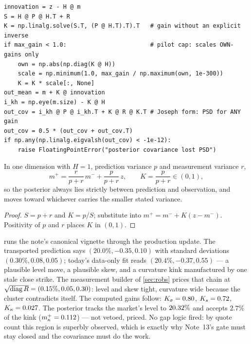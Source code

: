 \documentclass[11pt]{article}
\begin{document}
\begin{lstlisting}[caption={The production update (quoted from
\texttt{calib/observation\_filter.py}): \cref{eq:kalman} with the
own-gain pilot cap, Joseph covariance, and an explicit PSD guard.
Verified against the reference listing of \cref{app:ref} to
\ktrrefagree.},label={lst:crux}]
innovation = z - H @ m
S = H @ P @ H.T + R
K = np.linalg.solve(S.T, (P @ H.T).T).T   # gain without an explicit inverse
if max_gain < 1.0:                        # pilot cap: scales OWN-gains only
    own = np.abs(np.diag(K @ H))
    scale = np.minimum(1.0, max_gain / np.maximum(own, 1e-300))
    K = K * scale[:, None]
out_mean = m + K @ innovation
i_kh = np.eye(m.size) - K @ H
out_cov = i_kh @ P @ i_kh.T + K @ R @ K.T # Joseph form: PSD for ANY gain
out_cov = 0.5 * (out_cov + out_cov.T)
if np.any(np.linalg.eigvalsh(out_cov) < -1e-12):
    raise FloatingPointError("posterior covariance lost PSD")
\end{lstlisting}

\begin{proposition}
\label{prop:scalar}
In one dimension with $H=1$, prediction variance $p$ and measurement
variance $r$,
\[
m^+=\frac{r}{p+r}\,m^-+\frac{p}{p+r}\,z,
\qquad K=\frac{p}{p+r}\in(0,1),
\]
so the posterior always lies strictly between prediction and
observation, and moves toward whichever carries the smaller stated
variance.
\end{proposition}

\begin{proof}
$S=p+r$ and $K=p/S$; substitute into $m^+=m^-+K(z-m^-)$.  Positivity of
$p$ and $r$ places $K$ in $(0,1)$.
\end{proof}

 runs the note's canonical vignette through the
production update.  The transported prediction says
$(20.0\%,-0.35,0.10)$ with standard deviations $(0.30\%,0.08,0.05)$;
today's data-only fit reads $(20.4\%,-0.37,0.55)$ --- a plausible level
move, a plausible skew, and a curvature kink manufactured by one stale
close strike.  The measurement builder of \cref{sec:robs} prices that
chain at $\sqrt{\operatorname{diag} R}=(0.15\%,0.05,0.30)$: level and skew tight,
curvature wide because the cluster contradicts itself.  The computed
gains follow: $K_\sigma=0.80$, $K_s=0.72$,
$K_\kappa=0.027$.  The posterior tracks the market's level to
$20.32\%$ and accepts $2.7\%$ of the kink
($m^+_\kappa=0.112$) --- not vetoed, priced.  No gap logic fired:
by quote count this region is superbly observed, which is exactly why
Note~13's gate must stay closed and the covariance must do the work.
\end{document}
